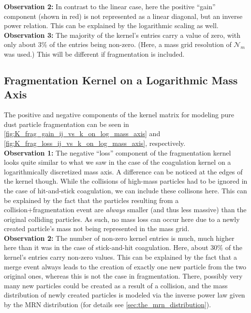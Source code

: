         \textbf{Observation 2:} In contrast to the linear case, here the positive ``gain''
        component (shown in red) is not represented as a linear diagonal, but an 
        inverse power relation. This can be explained by the logarithmic scaling as well. \\

        \textbf{Observation 3:} The majority of the kernel's entries carry a value of zero,
        with only about $3 \%$ of the entries being non-zero. 
        (Here, a mass grid resolution of $\mathcal N_m$ was used.)
        This will be different if fragmentation is included.
       
    \subsection{Fragmentation Kernel on a Logarithmic Mass Axis}

        The positive and negative components of the kernel matrix for modeling pure 
        dust particle fragmentation can be seen in 
        \cref{fig:K_frag_gain_ij_vs_k_on_log_mass_axis} and 
        \cref{fig:K_frag_loss_ij_vs_k_on_log_mass_axis}, respectively. \\


        \textbf{Observation 1:} The negative ``loss'' component of the fragmentation kernel 
        looks quite similar to what we saw in the case of the coagulation kernel on a 
        logarithmically discretized mass axis. A difference can be noticed at the edges 
        of the kernel though. While the collisions of high-mass particles had to be 
        ignored in the case of hit-and-stick coagulation, we can include these collisons
        here. This can be explained by the fact that the particles resulting from a 
        collision+fragmentation event are \textit{always} smaller (and thus less massive) than 
        the original colliding particles. As such, no mass loss can occur here due to a 
        newly created particle's mass not being represented in the mass grid. \\

        \textbf{Observation 2:} The number of non-zero kernel entries is much, much higher 
        here than it was in the case of stick-and-hit coagulation. Here, about $30 \%$ of the 
        kernel's entries carry non-zero values. This can be explained by 
        the fact that a merge event always leads to the creation of exactly one new particle 
        from the two original ones, whereas this is not the case in fragmentation. 
        There, possibly very many new particles could be created as a result of a collision,
        and the mass distribution of newly created particles is modeled via the inverse power 
        law given by the MRN distribution (for details see \cref{sec:the_mrn_distribution}). \\


